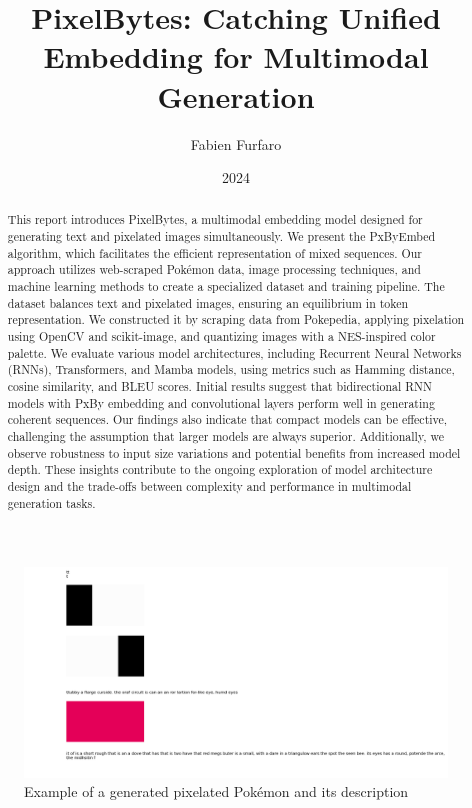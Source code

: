 \documentclass[10pt,a4paper]{article}
\title{\Large\textbf{PixelBytes: Catching Unified Embedding for Multimodal Generation}}
\author{\large Fabien Furfaro}
\date{\large 2024}
\begin{document}
\maketitle

\begin{abstract}
This report introduces PixelBytes, a multimodal embedding model designed for generating text and pixelated images simultaneously. We present the PxByEmbed algorithm, which facilitates the efficient representation of mixed sequences. Our approach utilizes web-scraped Pokémon data, image processing techniques, and machine learning methods to create a specialized dataset and training pipeline. The dataset balances text and pixelated images, ensuring an equilibrium in token representation. We constructed it by scraping data from Pokepedia, applying pixelation using OpenCV and scikit-image, and quantizing images with a NES-inspired color palette. We evaluate various model architectures, including Recurrent Neural Networks (RNNs), Transformers, and Mamba models, using metrics such as Hamming distance, cosine similarity, and BLEU scores. Initial results suggest that bidirectional RNN models with PxBy embedding and convolutional layers perform well in generating coherent sequences. Our findings also indicate that compact models can be effective, challenging the assumption that larger models are always superior. Additionally, we observe robustness to input size variations and potential benefits from increased model depth. These insights contribute to the ongoing exploration of model architecture design and the trade-offs between complexity and performance in multimodal generation tasks.
\end{abstract}

\begin{figure}[h]
\centering
\includegraphics[width=0.8\linewidth]{example_generation.png}
\caption{Example of a generated pixelated Pokémon and its description}
\label{fig:example_generation}
\end{figure}
\end{document}

